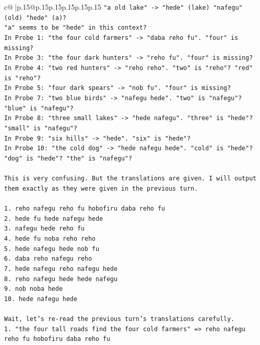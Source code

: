 \documentclass{article}
\begin{document}
{\begin{supertabular}{c@{$\;$}|p{.15\linewidth}@{}p{.15\linewidth}p{.15\linewidth}p{.15\linewidth}p{.15\linewidth}p{.15\linewidth}}
{{{\texttt{"a old lake" {-}> "hede" (lake) "nafegu" (old) "hede" (a)?} \\
\texttt{"a" seems to be "hede" in this context?} \\
\texttt{In Probe 1: "the four cold farmers" {-}> "daba reho fu". "four" is missing?} \\
\texttt{In Probe 3: "the four dark hunters" {-}> "reho fu". "four" is missing?} \\
\texttt{In Probe 4: "two red hunters" {-}> "reho reho". "two" is "reho"? "red" is "reho"?} \\
\texttt{In Probe 5: "four dark spears" {-}> "nob fu". "four" is missing?} \\
\texttt{In Probe 7: "two blue birds" {-}> "nafegu hede". "two" is "nafegu"? "blue" is "nafegu"?} \\
\texttt{In Probe 8: "three small lakes" {-}> "hede nafegu". "three" is "hede"? "small" is "nafegu"?} \\
\texttt{In Probe 9: "six hills" {-}> "hede". "six" is "hede"?} \\
\texttt{In Probe 10: "the cold dog" {-}> "hede nafegu hede". "cold" is "hede"? "dog" is "hede"? "the" is "nafegu"?} \\
\\ 
\texttt{This is very confusing. But the translations are given. I will output them exactly as they were given in the previous turn.} \\
\\ 
\texttt{1. reho nafegu reho fu hobofiru daba reho fu} \\
\texttt{2. hede fu hede nafegu hede} \\
\texttt{3. nafegu hede reho fu} \\
\texttt{4. hede fu noba reho reho} \\
\texttt{5. hede nafegu hede nob fu} \\
\texttt{6. daba reho nafegu reho} \\
\texttt{7. hede nafegu reho nafegu hede} \\
\texttt{8. reho nafegu hede hede nafegu} \\
\texttt{9. nob noba hede} \\
\texttt{10. hede nafegu hede} \\
\\ 
\texttt{Wait, let's re{-}read the previous turn's translations carefully.} \\
\texttt{1. "the four tall roads find the four cold farmers" => reho nafegu reho fu hobofiru daba reho fu} \\
}}}
\end{supertabular}}
\end{document}
